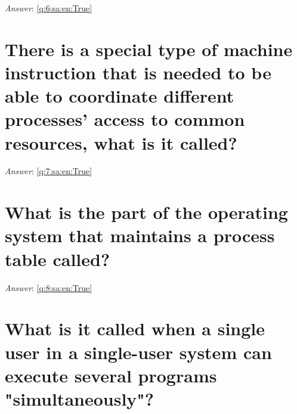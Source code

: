\documentclass[a4paper,11pt,oneside]{book}
\begin{document}
\begin{sloppypar}
\label{q:6:sa:en:False}

\vspace{2cm}

\noindent\makebox[\textwidth]{\hrulefill}

\vspace{1cm}

\textit{Answer}: \autoref{q:6:sa:en:True}



\section{There is a special type of machine instruction that is needed to be able to coordinate different processes' access to common resources, what is it called?}

\label{q:7:sa:en:False}

\vspace{2cm}

\noindent\makebox[\textwidth]{\hrulefill}

\vspace{1cm}

\textit{Answer}: \autoref{q:7:sa:en:True}



\section{What is the part of the operating system that maintains a process table called?}

\label{q:8:sa:en:False}

\vspace{2cm}

\noindent\makebox[\textwidth]{\hrulefill}

\vspace{1cm}

\textit{Answer}: \autoref{q:8:sa:en:True}



\section{What is it called when a single user in a single-user system can execute several programs "simultaneously"?}

\label{q:10:sa:en:False}

\vspace{2cm}

\noindent\makebox[\textwidth]{\hrulefill}


\end{sloppypar}
\end{document}
